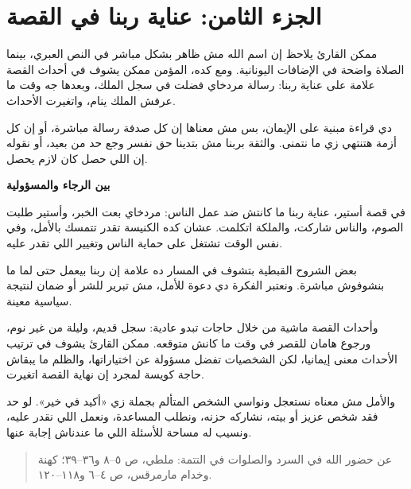 \documentclass[12pt,a4paper]{article}
\begin{document}
\section*{الجزء الثامن: عناية ربنا في القصة}
ممكن القارئ يلاحظ إن اسم الله مش ظاهر بشكل مباشر في النص العبري، بينما الصلاة واضحة في الإضافات اليونانية. ومع كده، المؤمن ممكن يشوف في أحداث القصة علامة على عناية ربنا: رسالة مردخاي فضلت في سجل الملك، وبعدها جه وقت ما عرفش الملك ينام، واتغيرت الأحداث.\par\medskip
دي قراءة مبنية على الإيمان، بس مش معناها إن كل صدفة رسالة مباشرة، أو إن كل أزمة هتنتهي زي ما نتمنى. والثقة بربنا مش بتدينا حق نفسر وجع حد من بعيد، أو نقوله إن اللي حصل كان لازم يحصل.\par\medskip
\vspace{0.2em}\noindent\textcolor{ochre}{\textbf{بين الرجاء والمسؤولية}}\par\smallskip
في قصة أستير، عناية ربنا ما كانتش ضد عمل الناس: مردخاي بعت الخبر، وأستير طلبت الصوم، والناس شاركت، والملكة اتكلمت. عشان كده الكنيسة تقدر تتمسك بالأمل، وفي نفس الوقت تشتغل على حماية الناس وتغيير اللي تقدر عليه.\par\medskip
بعض الشروح القبطية بتشوف في المسار ده علامة إن ربنا بيعمل حتى لما ما بنشوفوش مباشرة. ونعتبر الفكرة دي دعوة للأمل، مش تبرير للشر أو ضمان لنتيجة سياسية معينة.\par\medskip
وأحداث القصة ماشية من خلال حاجات تبدو عادية: سجل قديم، وليلة من غير نوم، ورجوع هامان للقصر في وقت ما كانش متوقعه. ممكن القارئ يشوف في ترتيب الأحداث معنى إيمانيا، لكن الشخصيات تفضل مسؤولة عن اختياراتها، والظلم ما يبقاش حاجة كويسة لمجرد إن نهاية القصة اتغيرت.\par\medskip
والأمل مش معناه نستعجل ونواسي الشخص المتألم بجملة زي «أكيد في خير». لو حد فقد شخص عزيز أو بيته، نشاركه حزنه، ونطلب المساعدة، ونعمل اللي نقدر عليه، ونسيب له مساحة للأسئلة اللي ما عندناش إجابة عنها.\par\medskip
\begin{quote}\small\color{muted}عن حضور الله في السرد والصلوات في التتمة: ملطي، ص ٥–٨ و٣٦–٣٩؛ كهنة وخدام مارمرقس، ص ٤–٦ و١١٨–١٢٠.\end{quote}
\clearpage
\clearpage
\end{document}
